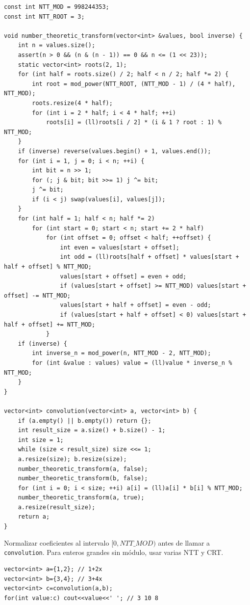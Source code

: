 \begin{lstlisting}[style=cpp]
const int NTT_MOD = 998244353;
const int NTT_ROOT = 3;

void number_theoretic_transform(vector<int> &values, bool inverse) {
    int n = values.size();
    assert(n > 0 && (n & (n - 1)) == 0 && n <= (1 << 23));
    static vector<int> roots(2, 1);
    for (int half = roots.size() / 2; half < n / 2; half *= 2) {
        int root = mod_power(NTT_ROOT, (NTT_MOD - 1) / (4 * half), NTT_MOD);
        roots.resize(4 * half);
        for (int i = 2 * half; i < 4 * half; ++i)
            roots[i] = (ll)roots[i / 2] * (i & 1 ? root : 1) % NTT_MOD;
    }
    if (inverse) reverse(values.begin() + 1, values.end());
    for (int i = 1, j = 0; i < n; ++i) {
        int bit = n >> 1;
        for (; j & bit; bit >>= 1) j ^= bit;
        j ^= bit;
        if (i < j) swap(values[i], values[j]);
    }
    for (int half = 1; half < n; half *= 2)
        for (int start = 0; start < n; start += 2 * half)
            for (int offset = 0; offset < half; ++offset) {
                int even = values[start + offset];
                int odd = (ll)roots[half + offset] * values[start + half + offset] % NTT_MOD;
                values[start + offset] = even + odd;
                if (values[start + offset] >= NTT_MOD) values[start + offset] -= NTT_MOD;
                values[start + half + offset] = even - odd;
                if (values[start + half + offset] < 0) values[start + half + offset] += NTT_MOD;
            }
    if (inverse) {
        int inverse_n = mod_power(n, NTT_MOD - 2, NTT_MOD);
        for (int &value : values) value = (ll)value * inverse_n % NTT_MOD;
    }
}

vector<int> convolution(vector<int> a, vector<int> b) {
    if (a.empty() || b.empty()) return {};
    int result_size = a.size() + b.size() - 1;
    int size = 1;
    while (size < result_size) size <<= 1;
    a.resize(size); b.resize(size);
    number_theoretic_transform(a, false);
    number_theoretic_transform(b, false);
    for (int i = 0; i < size; ++i) a[i] = (ll)a[i] * b[i] % NTT_MOD;
    number_theoretic_transform(a, true);
    a.resize(result_size);
    return a;
}
\end{lstlisting}

Normalizar coeficientes al intervalo $[0,NTT\_MOD)$ antes de llamar a
\texttt{convolution}. Para enteros grandes sin m\'odulo, usar varias NTT y CRT.

\begin{lstlisting}[style=cpp]
vector<int> a={1,2}; // 1+2x
vector<int> b={3,4}; // 3+4x
vector<int> c=convolution(a,b);
for(int value:c) cout<<value<<' '; // 3 10 8
\end{lstlisting}

